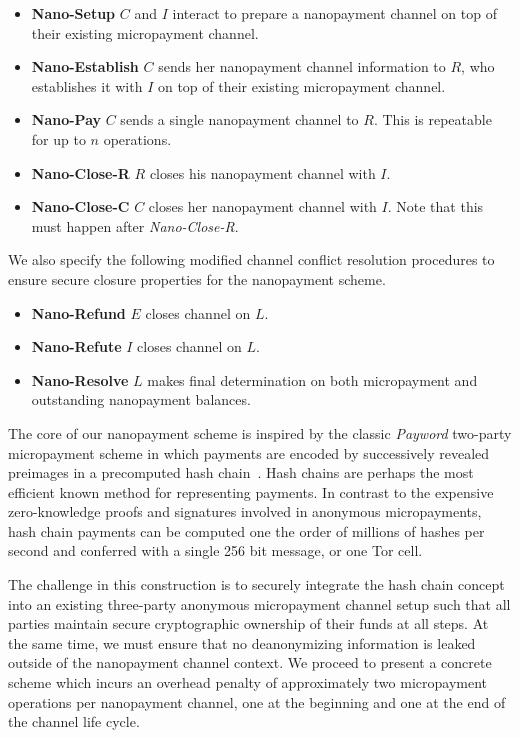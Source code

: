 \begin{itemize}
\item \textbf{Nano-Setup} $C$ and $I$ interact to prepare a nanopayment channel on top
  of their existing micropayment channel.
\item \textbf{Nano-Establish} $C$ sends her nanopayment channel information to $R$,
  who establishes it with $I$ on top of their existing micropayment channel.
\item \textbf{Nano-Pay} $C$ sends a single nanopayment channel to $R$. This is
  repeatable for up to $n$ operations.
\item \textbf{Nano-Close-R} $R$ closes his nanopayment channel with $I$.
\item \textbf{Nano-Close-C} $C$ closes her nanopayment channel with $I$. Note that
  this must happen after \emph{Nano-Close-R}.
\end{itemize}

We also specify the following modified channel conflict resolution procedures to
ensure secure closure properties for the nanopayment scheme.

\begin{itemize}
\item \textbf{Nano-Refund} $E$ closes channel on $L$.
\item \textbf{Nano-Refute} $I$ closes channel on $L$.
\item \textbf{Nano-Resolve} $L$ makes final determination on both micropayment and
  outstanding nanopayment balances.
\end{itemize}

The core of our nanopayment scheme is inspired by the classic \emph{Payword}
two-party micropayment scheme in which payments are encoded by successively
revealed preimages in a precomputed hash chain~\cite{rivest1996payword}. Hash
chains are perhaps the most efficient known method for representing payments. In
contrast to the expensive zero-knowledge proofs and signatures involved in
anonymous micropayments, hash chain payments can be computed one the order of
millions of hashes per second and conferred with a single 256 bit message, or
one Tor cell.

The challenge in this construction is to securely integrate the hash chain
concept into an existing three-party anonymous micropayment channel setup such
that all parties maintain secure cryptographic ownership of their funds at all
steps. At the same time, we must ensure that no deanonymizing information is
leaked outside of the nanopayment channel context. We proceed to present a
concrete scheme which incurs an overhead penalty of approximately two
micropayment operations per nanopayment channel, one at the beginning and one at
the end of the channel life cycle.

